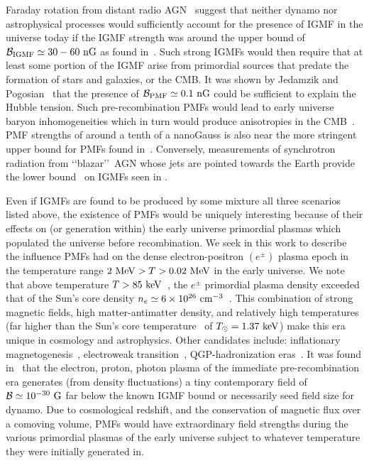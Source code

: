 \documentclass[a4paper]{article}
\begin{document}
Faraday rotation from distant radio AGN~\cite{pomakov2022redshift} suggest that neither dynamo nor astrophysical processes would sufficiently account for the presence of IGMF in the universe today if the IGMF strength was around the upper bound of ${\cal B}_{\rm IGMF}\simeq30-60{\rm\ nG}$ as found in~\cite{vernstrom2021discovery}. Such strong IGMFs would then require that at least some portion of the IGMF arise from primordial sources that predate the formation of stars and galaxies, or the CMB. It was shown by Jedamzik and Pogosian~\cite{jedamzik2020relieving} that the presence of ${\cal B}_{\rm PMF}\simeq0.1{\rm\ nG}$ could be sufficient to explain the Hubble tension. Such pre-recombination PMFs would lead to early universe baryon inhomogeneities which in turn would produce anisotropies in the CMB~\cite{jedamzik2013smallscale}. PMF strengths of around a tenth of a nanoGauss is also near the more stringent upper bound for PMFs found in~\cite{pshirkov2015new,jedamzik2019stringent}. Conversely, measurements of synchrotron radiation from \lq\lq blazar\rq\rq\ AGN whose jets are pointed towards the Earth provide the lower bound~\cite{neronov2010evidence,taylor2011extragalactic} on IGMFs seen in .


Even if IGMFs are found to be produced by some mixture all three scenarios listed above, the existence of PMFs would be uniquely interesting because of their effects on (or generation within) the early universe primordial plasmas which populated the universe before recombination. We seek in this work to describe the influence PMFs had on the dense electron-positron $(e^{\pm})$ plasma epoch in the temperature range $2\text{ MeV}>T>0.02\text{ MeV}$ in the early universe. We note that above temperature $T>85\text{ keV}$~\cite{rafelski2023short}, the $e^{\pm}$ primordial plasma density exceeded that of the Sun's core density $n_{e}\simeq6\times10^{26}{\rm\ cm}^{-3}$~\cite{bahcall2001solar}. This combination of strong magnetic fields, high matter-antimatter density, and relatively high temperatures (far higher than the Sun's core temperature~\cite{castellani1997solar} of $T_{\odot}=1.37\text{ keV}$) make this era unique in cosmology and astrophysics. Other candidates include: inflationary magnetogenesis~\cite{subramanian2009magnetic}, electroweak transition~\cite{vachaspati2020progress}, QGP-hadronization eras~\cite{bali2011qcd}. It was found in~\cite{gopal2004generation} that the electron, proton, photon plasma of the immediate pre-recombination era generates (from density fluctuations) a tiny contemporary field of ${\cal B}\simeq10^{-30}{\rm\ G}$ far below the known IGMF bound or necessarily seed field size for dynamo. Due to cosmological redshift, and the conservation of magnetic flux over a comoving volume, PMFs would have extraordinary field strengths during the various primordial plasmas of the early universe subject to whatever temperature they were initially generated in.
\end{document}

